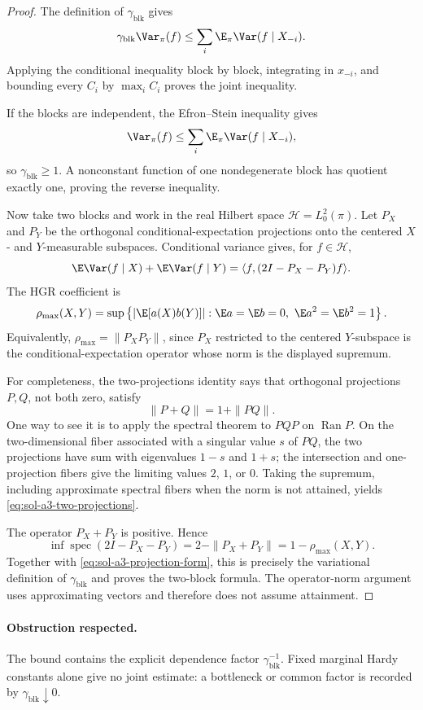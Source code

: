 \documentclass[../main.tex]{subfiles}
\begin{document}
\begin{proof}
The definition of $\gamma_{\mathrm{blk}}$ gives
\[
 \gamma_{\mathrm{blk}}\Var_\pi(f)
 \le\sum_i\E_\pi\Var(f\mid X_{-i}).
\]
Applying the conditional inequality block by block, integrating in $x_{-i}$, and bounding every
$C_i$ by $\max_iC_i$ proves the joint inequality.

If the blocks are independent, the Efron--Stein inequality gives
\[
 \Var_\pi(f)\le\sum_i\E_\pi\Var(f\mid X_{-i}),
\]
so $\gamma_{\mathrm{blk}}\ge1$.  A nonconstant function of one nondegenerate block has quotient
exactly one, proving the reverse inequality.

Now take two blocks and work in the real Hilbert space $\mathcal H=L^2_0(\pi)$.  Let $P_X$ and
$P_Y$ be the orthogonal conditional-expectation projections onto the centered $X$- and
$Y$-measurable subspaces.  Conditional variance gives, for $f\in\mathcal H$,
\begin{equation}
\label{eq:sol-a3-projection-form}
 \E\Var(f\mid X)+\E\Var(f\mid Y)
 =\langle f,(2I-P_X-P_Y)f\rangle.
\end{equation}
The HGR coefficient is
\[
 \rho_{\max}(X,Y)
 =\sup\left\{|\E[a(X)b(Y)]|:
   \E a=\E b=0,\ \E a^2=\E b^2=1\right\}.
\]
Equivalently,
$\rho_{\max}=\|P_XP_Y\|$, since $P_X$ restricted to the centered $Y$-subspace is the
conditional-expectation operator whose norm is the displayed supremum.

For completeness, the two-projections identity says that orthogonal projections $P,Q$, not both
zero, satisfy
\begin{equation}
\label{eq:sol-a3-two-projections}
 \|P+Q\|=1+\|PQ\|.
\end{equation}
One way to see it is to apply the spectral theorem to $PQP$ on $\operatorname{Ran}P$.
On the two-dimensional fiber associated with a singular value $s$ of $PQ$, the two projections
have sum with eigenvalues $1-s$ and $1+s$; the intersection and one-projection fibers give the
limiting values $2$, $1$, or $0$.  Taking the supremum, including approximate spectral fibers
when the norm is not attained, yields \eqref{eq:sol-a3-two-projections}.

The operator $P_X+P_Y$ is positive.  Hence
\[
 \inf\operatorname{spec}(2I-P_X-P_Y)
 =2-\|P_X+P_Y\|
 =1-\rho_{\max}(X,Y).
\]
Together with \eqref{eq:sol-a3-projection-form}, this is precisely the variational definition of
$\gamma_{\mathrm{blk}}$ and proves the two-block formula.  The operator-norm argument uses
approximating vectors and therefore does not assume attainment.
\end{proof}

\paragraph{Obstruction respected.}
The bound contains the explicit dependence factor $\gamma_{\mathrm{blk}}^{-1}$.  Fixed marginal
Hardy constants alone give no joint estimate: a bottleneck or common factor is recorded by
$\gamma_{\mathrm{blk}}\downarrow0$.
\end{document}
